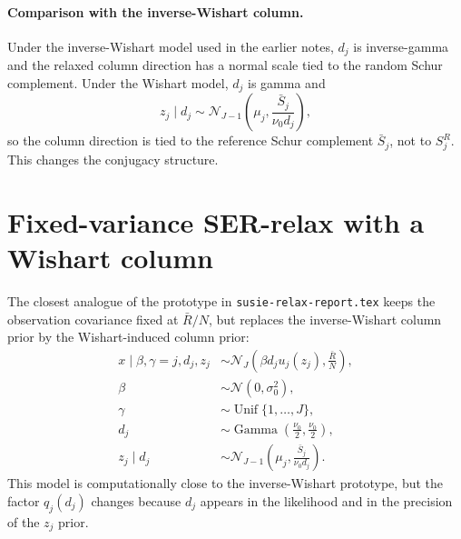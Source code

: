 \documentclass[11pt]{article}
\newcommand{\Rbar}{\bar R}
\newcommand{\Sbar}{\bar S}
\newcommand{\Unif}{\operatorname{Unif}}
\newcommand{\Gam}{\operatorname{Gamma}}
\newcommand{\Normal}{\mathcal N}
\begin{document}
\paragraph{Comparison with the inverse-Wishart column.}
Under the inverse-Wishart model used in the earlier notes, \(d_j\) is
inverse-gamma and the relaxed column direction has a normal scale tied to
the random Schur complement. Under the Wishart model, \(d_j\) is gamma
and
\[
z_j\mid d_j\sim
\Normal_{J-1}\left(\mu_j,\frac{\Sbar_j}{\nu_0d_j}\right),
\]
so the column direction is tied to the reference Schur complement
\(\Sbar_j\), not to \(S_j^R\). This changes the conjugacy structure.

\section{Fixed-variance SER-relax with a Wishart column}

The closest analogue of the prototype in
\texttt{susie-relax-report.tex} keeps the observation covariance fixed at
\(\Rbar/N\), but replaces the inverse-Wishart column prior by the
Wishart-induced column prior:
\begin{align}
x\mid \beta,\gamma=j,d_j,z_j
&\sim
\Normal_J\left(\beta d_j u_j(z_j),\frac{\Rbar}{N}\right), \\
\beta&\sim \Normal(0,\sigma_0^2), \\
\gamma&\sim \Unif\{1,\ldots,J\}, \\
d_j&\sim \Gam\left(\frac{\nu_0}{2},\frac{\nu_0}{2}\right), \\
z_j\mid d_j
&\sim
\Normal_{J-1}\left(\mu_j,\frac{\Sbar_j}{\nu_0d_j}\right).
\end{align}
This model is computationally close to the inverse-Wishart prototype, but
the factor \(q_j(d_j)\) changes because \(d_j\) appears in the likelihood
and in the precision of the \(z_j\) prior.
\end{document}
